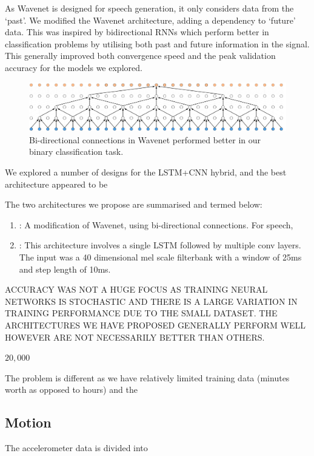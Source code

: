 \documentclass[12pt, twoside]{book}
\renewcommand\emph[1]{\textit{\color{USred}{#1}}}
\begin{document}
As Wavenet is designed for speech generation, it only considers data from the `past'. We modified the Wavenet architecture, adding a dependency to `future' data. This was inspired by bidirectional RNNs which perform better in classification problems by utilising both past and future information in the signal. This generally improved both convergence speed and the peak validation accuracy for the models we explored.

\begin{figure}[h]
	\label{biwavenet}
	\centering\centerline{\includegraphics[width=1\linewidth]{biwavenet.png}}
	\caption{Bi-directional connections in Wavenet performed better in our binary classification task. }
\end{figure}

We explored a number of designs for the LSTM+CNN hybrid, and the best architecture appeared to be 

The two architectures we propose are summarised and termed below:
\begin{enumerate}
	\item \emph{Bi-Wavenet}: A modification of Wavenet, using bi-directional connections. For speech, 
	\item \emph{LSTMConv}: This architecture involves a single LSTM followed by multiple conv layers. The input was a 40 dimensional mel scale filterbank with a window of 25ms and step length of 10ms.
\end{enumerate}



ACCURACY WAS NOT A HUGE FOCUS AS TRAINING NEURAL NETWORKS IS STOCHASTIC AND THERE IS A LARGE VARIATION IN TRAINING PERFORMANCE DUE TO THE SMALL DATASET.
 THE ARCHITECTURES WE HAVE PROPOSED GENERALLY PERFORM WELL HOWEVER ARE NOT NECESSARILY BETTER THAN OTHERS.

$20,000$


The problem is different as we have relatively limited training data (minutes worth as opposed to hours) and the 






\subsection{Motion}
The accelerometer data is divided into
\end{document}
